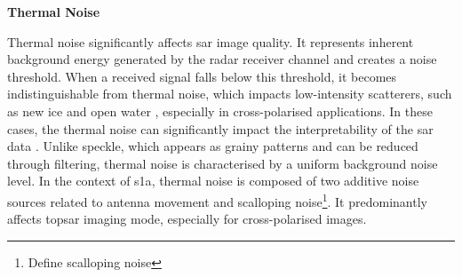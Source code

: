\textbf{Thermal Noise}

Thermal noise significantly affects \acs{sar} image quality. It represents inherent background energy generated by the radar receiver channel and creates a noise threshold. When a received signal falls below this threshold, it becomes indistinguishable from thermal noise, which impacts low-intensity scatterers, such as new ice and open water \cite{Carsey1992}, especially in cross-polarised applications. In these cases, the thermal noise can significantly impact the interpretability of the \acs{sar} data \cite{Carsey1992}. Unlike speckle, which appears as grainy patterns and can be reduced through filtering, thermal noise is characterised by a uniform background noise level. In the context of \acs{s1a}, thermal noise is composed of two additive noise sources related to antenna movement and scalloping noise\footnote{Define scalloping noise}. It predominantly affects \acs{topsar} imaging mode, especially for cross-polarised images.




